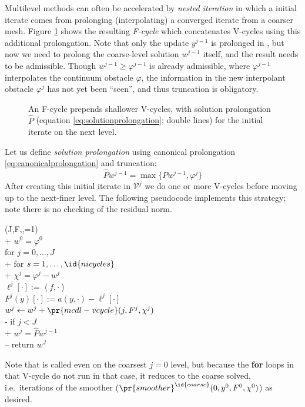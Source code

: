 \documentclass[letterpaper,final,12pt,reqno]{amsart}
\theoremstyle{claim}
\newcommand{\ip}[2]{\left<#1,#2\right>}
\numberwithin{equation}{section}
\numberwithin{figure}{section}
\numberwithin{table}{section}
\numberwithin{theorem}{section}
\begin{document}
Multilevel methods can often be accelerated by \emph{nested iteration} \cite{Trottenbergetal2001} in which a initial iterate comes from prolonging (interpolating) a converged iterate from a coarser mesh.  Figure \ref{fig:fcycle} shows the resulting \emph{F-cycle} which concatenates V-cycles using this additional prolongation.  Note that only the update $y^{j-1}$ is prolonged in , but now we need to prolong the coarse-level solution $w^{j-1}$ itself, and the result needs to be admissible.  Though $w^{j-1} \ge \varphi^{j-1}$ is already admissible, where $\varphi^{j-1}$ interpolates the continuum obstacle $\varphi$, the information in the new interpolant obstacle $\varphi^j$ has not yet been ``seen'', and thus truncation is obligatory.

\begin{figure}

\caption{An F-cycle prepends shallower V-cycles, with solution prolongation $\hat P$ (equation \eqref{eq:solutionprolongation}; double lines) for the initial iterate on the next level.}
\label{fig:fcycle}
\end{figure}

Let us define \emph{solution prolongation} using canonical prolongation \eqref{eq:canonicalprolongation} and truncation:
\begin{equation}
\hat P w^{j-1} = \max\{P w^{j-1}, \varphi^{j}\}  \label{eq:solutionprolongation}
\end{equation}
After creating this initial iterate in $\mathcal{V}^j$ we do one or more V-cycles before moving up to the next-finer level.  The following pseudocode implements this strategy; note there is no checking of the residual norm.
\begin{pseudo*} \label{ps:mcdl-fcycle}
(J,F,\varphi,=1)\text{:} \\+
    $w^0=\varphi^0$ \qquad\qquad\qquad\qquad\qquad\quad {} \\
    for $j=0,\dots,J$ \\+
        for $s=1,\dots,\id{nicycles}$ \qquad\qquad\qquad {} \\+
            $\chi^j = \varphi^j - w^j$ \qquad\qquad\qquad\quad {} \\
            $\ell^j[\cdot] := \ip{f}{\cdot}$ \\
            $F^j(y)[\cdot] := a(y,\cdot) - \ell^j[\cdot]$ \\
            $w^j \gets w^j+\pr{mcdl-vcycle}(j,F^j,\chi^j)$ \\-
        if $j < J$ \\+
            $w^j = \hat P w^{j-1}$ \qquad\qquad\qquad {} \\--
    return $w^J$
\end{pseudo*}
Note that  is called even on the coarsest $j=0$ level, but because the \textbf{for} loops in that V-cycle do not run in that case, it reduces to the coarse solved, i.e.~iterations of the smoother ($\pr{smoother}^{\id{coarse}}(0,y^0,F^0,\chi^0)$) as desired.
\end{document}
